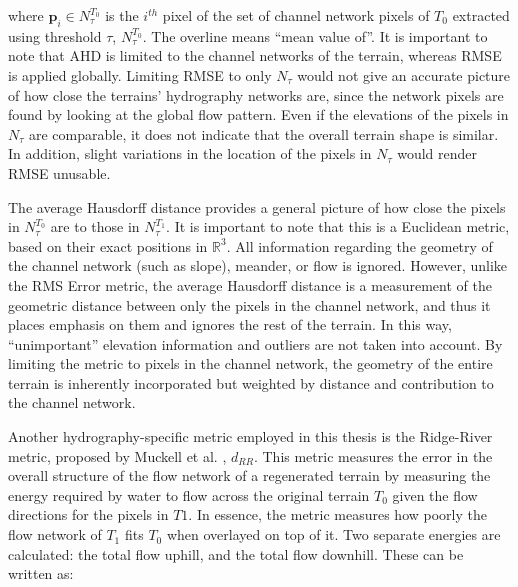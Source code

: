 \noindent where 
$\textbf{p}_{i} \in N^{T_{0}}_{\tau}$ is the $i^{th}$ pixel of the set of channel network pixels 
of $T_{0}$ extracted using threshold $\tau$, $N^{T_{0}}_{\tau}$. The overline means ``mean value of''. 
It is important to note that AHD is limited to the channel networks of the terrain, whereas RMSE is applied globally. 
Limiting RMSE to only $N_{\tau}$ would not give an accurate picture of how close the terrains' hydrography networks are, 
since the network pixels are found by looking at the global flow pattern. Even if the elevations of the pixels in $N_{\tau}$ 
are comparable, it does not indicate that the overall terrain shape is similar. In addition, slight variations 
in the location of the pixels in $N_{\tau}$ would render RMSE unusable.



The average Hausdorff distance provides a general picture of how close the pixels in $N^{T_{0}}_{\tau}$ are to those in $N^{T_{1}}_{\tau}$. It is important to note that this is a Euclidean metric, based on their exact positions in $\mathbb{R}^{3}$. All information regarding the geometry of the channel network (such as slope), meander, or flow is ignored. However, unlike the RMS Error metric, the average Hausdorff distance is a measurement of the geometric distance between only the pixels in the channel network, and thus it places emphasis on them and ignores the rest of the terrain. In this way, ``unimportant'' elevation information and outliers are not taken into account. By limiting the metric to pixels in the channel network, the geometry of the entire terrain is inherently incorporated but weighted by distance and contribution to the channel network.

Another hydrography-specific metric employed in this thesis is the Ridge-River metric, proposed by Muckell et al. \cite{Muckell:2009:EHP:1517463.1517470}, $d_{RR}$. This metric measures the error in the overall structure of the flow network of a regenerated terrain by measuring the energy required by water to flow across the original terrain $T_{0}$ given the flow directions for the pixels in $T{1}$. In essence, the metric measures how poorly the flow network of $T_{1}$ fits $T_{0}$ when overlayed on top of it. Two separate energies are calculated: the total flow uphill, and the total flow downhill. These can be written as:

